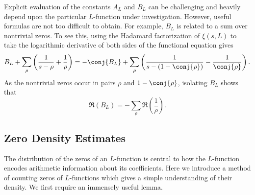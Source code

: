 \documentclass[12pt]{article}
\begin{document}
      Explicit evaluation of the constants \(A_{L}\) and \(B_{L}\) can be challenging and heavily depend upon the particular \(L\)-function under investigation. However, useful formulas are not too difficult to obtain. For example, \(B_{L}\) is related to a sum over nontrivial zeros. To see this, using the Hadamard factorization of \(\xi(s,L)\) to take the logarithmic derivative of both sides of the functional equation gives
      \[
        B_{L}+\sum_{\rho}\left(\frac{1}{s-\rho}+\frac{1}{\rho}\right) = -\conj{B_{L}}+\sum_{\rho}\left(\frac{1}{s-(1-\conj{\rho})}-\frac{1}{\conj{\rho}}\right).
      \]
      As the nontrivial zeros occur in pairs \(\rho\) and \(1-\conj{\rho}\), isolating \(B_{L}\) shows that
      \begin{equation}\label{equ:B_L_real_part}
        \Re(B_{L}) = -\sum_{\rho}\Re\left(\frac{1}{\rho}\right).
      \end{equation}
    \subsection{Zero Density Estimates}
      The distribution of the zeros of an \(L\)-function is central to how the \(L\)-function encodes arithmetic information about its coefficients. Here we introduce a method of counting zeros of \(L\)-functions which gives a simple understanding of their density. We first require an immensely useful lemma.
\end{document}
